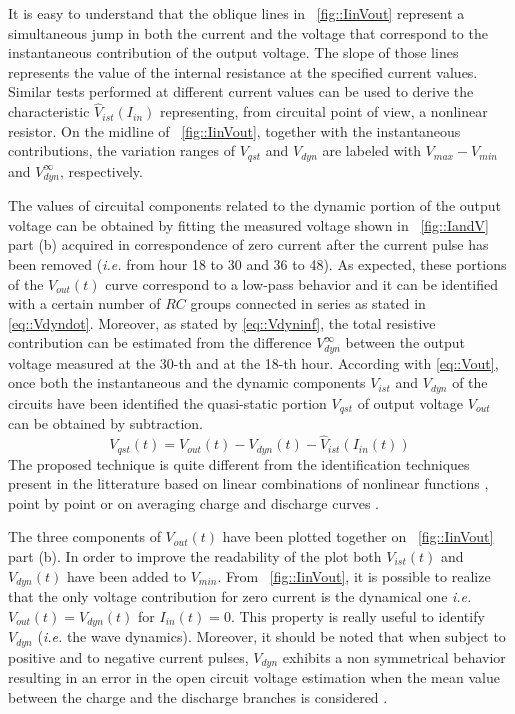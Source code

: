 \documentclass[journal]{IEEEtran}
\begin{document}
It is easy to understand that the oblique lines in \figurename~\ref{fig::IinVout} represent a simultaneous jump in both the current and the voltage that correspond to the instantaneous contribution of the output voltage.
The slope of those lines represents the value of the internal resistance at the specified current values. Similar tests performed at different current values can be used to derive the characteristic $\hat{V}_{ist}(I_{in})$ representing, from  circuital point of view, a nonlinear resistor.
On the midline of \figurename~\ref{fig::IinVout}, together with the instantaneous contributions, the variation ranges of ${V}_{qst}$ and ${V}_{dyn}$ are labeled with $V_{max}-V_{min}$ and $V_{dyn}^{\infty}$, respectively.

The values of circuital components related to the dynamic portion of the output voltage can be obtained by fitting the measured voltage shown in \figurename~\ref{fig::IandV} part (b) acquired in correspondence of zero current after the current pulse has been removed (\textit{i.e.} from hour 18 to 30 and 36 to 48). As expected, these portions of the $V_{out}(t)$ curve correspond to a low-pass behavior and it can be identified with a certain number of $RC$ groups connected in series as stated in \eqref{eq::Vdyndot}. Moreover, as stated by \eqref{eq::Vdyninf}, the total resistive contribution can be estimated from the difference $V_{dyn}^{\infty}$ between the output voltage measured at the 30-th and at the 18-th hour. 
According with \eqref{eq::Vout}, once both the instantaneous and the dynamic components $V_{ist}$ and $V_{dyn}$ of the circuits have been identified the quasi-static portion $V_{qst}$ of output voltage $V_{out}$ can be obtained by subtraction. 
\begin{equation}
V_{qst}(t)=V_{out}(t)-V_{dyn}(t)-\hat{V}_{ist}(I_{in}(t))
\label{eq::Vqst}
\end{equation}
The proposed technique is quite different from the identification techniques present in the litterature based on linear combinations of nonlinear functions \cite{Plett_2004_b,Paschero_2010_b}, point by point \cite{Birkl_2015} or on averaging charge and discharge curves \cite{Hu_2011, Baronti_2015}.

The three components of $V_{out}(t)$ have been plotted together on \figurename~\ref{fig::IinVout} part (b). In order to improve the readability of the plot both $V_{ist}(t)$ and $V_{dyn}(t)$ have been added to $V_{min}$.
From \figurename~\ref{fig::IinVout}, it is possible to realize that the only voltage contribution for zero current is the dynamical one \textit{i.e.}  $V_{out}(t)=V_{dyn}(t)$ for $I_{in}(t)=0$. This property is really useful to identify $V_{dyn}$ (\textit{i.e.} the wave dynamics). Moreover, it should be noted that when subject to positive and to negative current pulses, $V_{dyn}$ exhibits a non symmetrical behavior resulting in an error in the open circuit voltage estimation when the mean value between the charge and the discharge branches is considered \cite{Hu_2011, Baronti_2015}.
\end{document}
